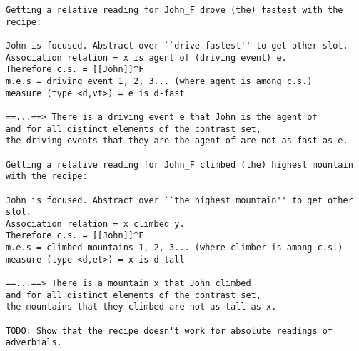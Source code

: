 \documentclass{article}
\begin{document}
\begin{verbatim}
Getting a relative reading for John_F drove (the) fastest with the recipe:

John is focused. Abstract over ``drive fastest'' to get other slot.
Association relation = x is agent of (driving event) e.
Therefore c.s. = [[John]]^F
m.e.s = driving event 1, 2, 3... (where agent is among c.s.)
measure (type <d,vt>) = e is d-fast

==...==> There is a driving event e that John is the agent of
and for all distinct elements of the contrast set, 
the driving events that they are the agent of are not as fast as e.

Getting a relative reading for John_F climbed (the) highest mountain with the recipe:

John is focused. Abstract over ``the highest mountain'' to get other slot.
Association relation = x climbed y.
Therefore c.s. = [[John]]^F
m.e.s = climbed mountains 1, 2, 3... (where climber is among c.s.)
measure (type <d,et>) = x is d-tall

==...==> There is a mountain x that John climbed
and for all distinct elements of the contrast set, 
the mountains that they climbed are not as tall as x.

TODO: Show that the recipe doesn't work for absolute readings of adverbials.
\end{verbatim}









\end{document}
